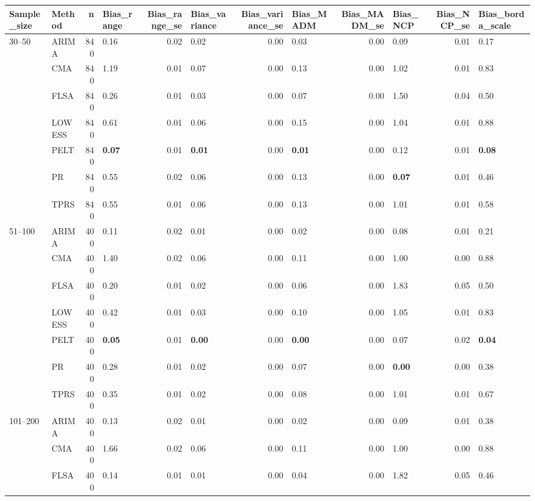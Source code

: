 \begin{table}[ht]
\centering
\begin{tabular}{llrlrlrlrlrl}
  \toprule
Sample_size & Method & n & Bias_range & Bias_range_se & Bias_variance & Bias_variance_se & Bias_MADM & Bias_MADM_se & Bias_NCP & Bias_NCP_se & Bias_borda_scale \\ 
  \midrule
30–50 & ARIMA & 840 & 0.16 & 0.02 & 0.02 & 0.00 & 0.03 & 0.00 & 0.09 & 0.01 & 0.17 \\ 
   & CMA & 840 & 1.19 & 0.01 & 0.07 & 0.00 & 0.13 & 0.00 & 1.02 & 0.01 & 0.83 \\ 
   & FLSA & 840 & 0.26 & 0.01 & 0.03 & 0.00 & 0.07 & 0.00 & 1.50 & 0.04 & 0.50 \\ 
   & LOWESS & 840 & 0.61 & 0.01 & 0.06 & 0.00 & 0.15 & 0.00 & 1.04 & 0.01 & 0.88 \\ 
   & PELT & 840 & \textbf{0.07} & 0.01 & \textbf{0.01} & 0.00 & \textbf{0.01} & 0.00 & 0.12 & 0.01 & \textbf{0.08} \\ 
   & PR & 840 & 0.55 & 0.02 & 0.06 & 0.00 & 0.13 & 0.00 & \textbf{0.07} & 0.01 & 0.46 \\ 
   & TPRS & 840 & 0.55 & 0.01 & 0.06 & 0.00 & 0.13 & 0.00 & 1.01 & 0.01 & 0.58 \\ 
  51–100 & ARIMA & 400 & 0.11 & 0.02 & 0.01 & 0.00 & 0.02 & 0.00 & 0.08 & 0.01 & 0.21 \\ 
   & CMA & 400 & 1.40 & 0.02 & 0.06 & 0.00 & 0.11 & 0.00 & 1.00 & 0.00 & 0.88 \\ 
   & FLSA & 400 & 0.20 & 0.01 & 0.02 & 0.00 & 0.06 & 0.00 & 1.83 & 0.05 & 0.50 \\ 
   & LOWESS & 400 & 0.42 & 0.01 & 0.03 & 0.00 & 0.10 & 0.00 & 1.05 & 0.01 & 0.83 \\ 
   & PELT & 400 & \textbf{0.05} & 0.01 & \textbf{0.00} & 0.00 & \textbf{0.00} & 0.00 & 0.07 & 0.02 & \textbf{0.04} \\ 
   & PR & 400 & 0.28 & 0.01 & 0.02 & 0.00 & 0.07 & 0.00 & \textbf{0.00} & 0.00 & 0.38 \\ 
   & TPRS & 400 & 0.35 & 0.01 & 0.02 & 0.00 & 0.08 & 0.00 & 1.01 & 0.01 & 0.67 \\ 
  101–200 & ARIMA & 400 & 0.13 & 0.02 & 0.01 & 0.00 & 0.02 & 0.00 & 0.09 & 0.01 & 0.38 \\ 
   & CMA & 400 & 1.66 & 0.02 & 0.06 & 0.00 & 0.11 & 0.00 & 1.00 & 0.00 & 0.88 \\ 
   & FLSA & 400 & 0.14 & 0.01 & 0.01 & 0.00 & 0.04 & 0.00 & 1.82 & 0.05 & 0.46 \\ 

\end{tabular}
\end{table}
